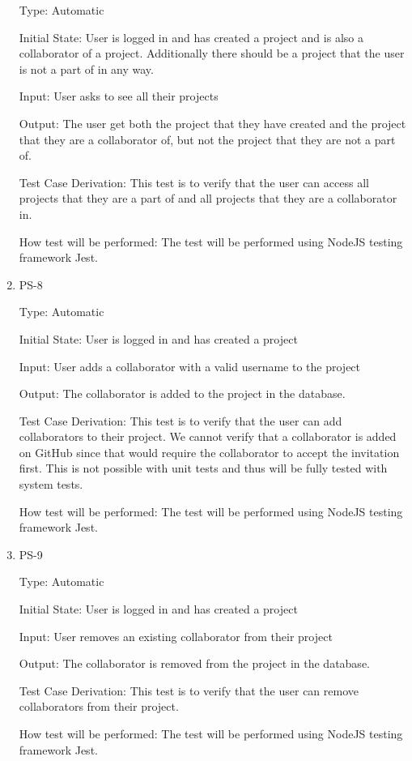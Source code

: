 \documentclass[12pt, titlepage]{article}
\begin{document}
\begin{enumerate}
		Type: Automatic
		
		Initial State: User is logged in and has created a project and is also a collaborator of a project. Additionally there should be a project that the user is not a part of in any way.
		
		Input: User asks to see all their projects
		
		Output: The user get both the project that they have created and the project that they are a collaborator of, but not the project that they are not a part of.
		
		Test Case Derivation: This test is to verify that the user can access all projects that they are a part of and all projects that they are a collaborator in.
		
		How test will be performed: The test will be performed using NodeJS testing framework Jest.
		
		\item{PS-8\\}
		
		Type: Automatic
		
		Initial State: User is logged in and has created a project
		
		Input: User adds a collaborator with a valid username to the project
		
		Output: The collaborator is added to the project in the database.
		
		Test Case Derivation: This test is to verify that the user can add collaborators to their project. We cannot verify that a collaborator is added on GitHub since that would require the collaborator to accept the invitation first. This is not possible with unit tests and thus will be fully tested with system tests.
		
		How test will be performed: The test will be performed using NodeJS testing framework Jest.
		
		\item{PS-9\\}
		
		Type: Automatic
		
		Initial State: User is logged in and has created a project
		
		Input: User removes an existing collaborator from their project
		
		Output: The collaborator is removed from the project in the database.
		
		Test Case Derivation: This test is to verify that the user can remove collaborators from their project.
		
		How test will be performed: The test will be performed using NodeJS testing framework Jest.
		
	\end{enumerate}
	
\end{document}
